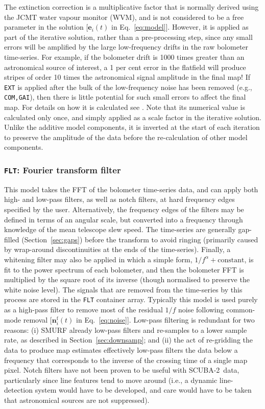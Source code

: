 \documentclass[useAMS,usenatbib,nofootinbib]{mn2e}
\newcommand{\scuba}{SCUBA-2}
\newcommand{\model}[1]{\texttt{#1}}
\begin{document}
The extinction correction is a multiplicative factor that is normally
derived using the JCMT water vapour monitor (WVM), and is not
considered to be a free parameter in the solution [$\mathbf{e}_i(t)$
in Eq.~\ref{eq:model}]. However, it is applied as part of the
iterative solution, rather than a pre-processing step, since any small
errors will be amplified by the large low-frequency drifts in the raw
bolometer time-series. For example, if the bolometer drift is 1000
times greater than an astronomical source of interest, a 1 per cent
error in the flatfield will produce stripes of order 10 times the
astronomical signal amplitude in the final map! If \model{EXT} is
applied after the bulk of the low-frequency noise has been removed
(e.g., \model{COM,GAI}), then there is little potential for such small
errors to affect the final map.  For details on how it is calculated
see \citet{dempsey2012}. Note that its numerical value is calculated
only once, and simply applied as a scale factor in the iterative
solution. Unlike the additive model components, it is inverted at the
start of each iteration to preserve the amplitude of the data before
the re-calculation of other model components.

\subsubsection{\model{FLT}: Fourier transform filter}
\label{sec:flt}

This model takes the FFT of the bolometer time-series data, and can
apply both high- and low-pass filters, as well as notch filters, at
hard frequency edges specified by the user. Alternatively, the
frequency edges of the filters may be defined in terms of an angular
scale, but converted into a frequency through knowledge of the mean
telescope slew speed. The time-series are generally gap-filled
(Section~\ref{sec:gaps}) before the transform to avoid ringing
(primarily caused by wrap-around discontinuities at the ends of the
time-series). Finally, a whitening filter may also be applied in which
a simple form, $1/f^\alpha + \mathrm{constant}$, is fit to the power
spectrum of each bolometer, and then the bolometer FFT is multiplied
by the square root of its inverse (though normalised to preserve the
white noise level).  The signals that are removed from the time-series
by this process are stored in the \model{FLT} container
array. Typically this model is used purely as a high-pass filter to
remove most of the residual $1/f$ noise following common-mode removal
[$\mathbf{n}^\mathrm{f}_i(t)$ in Eq.~\ref{eq:noise}]. Low-pass
filtering is redundant for two reasons: (i) SMURF already low-pass
filters and re-samples to a lower sample rate, as described in
Section~\ref{sec:downsamp}; and (ii) the act of re-gridding the data
to produce map estimates effectively low-pass filters the data below a
frequency that corresponds to the inverse of the crossing time of a
single map pixel. Notch filters have not been proven to be useful with
\scuba\ data, particularly since line features tend to move around
(i.e., a dynamic line-detection system would have to be developed, and
care would have to be taken that astronomical sources are not
suppressed).
\end{document}
